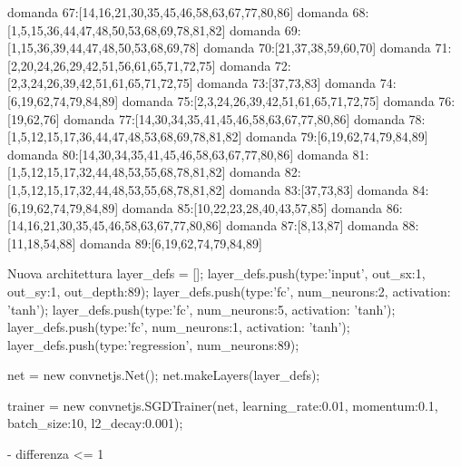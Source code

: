domanda 67:[14,16,21,30,35,45,46,58,63,67,77,80,86]
domanda 68:[1,5,15,36,44,47,48,50,53,68,69,78,81,82]
domanda 69:[1,15,36,39,44,47,48,50,53,68,69,78]
domanda 70:[21,37,38,59,60,70]
domanda 71:[2,20,24,26,29,42,51,56,61,65,71,72,75]
domanda 72:[2,3,24,26,39,42,51,61,65,71,72,75]
domanda 73:[37,73,83]
domanda 74:[6,19,62,74,79,84,89]
domanda 75:[2,3,24,26,39,42,51,61,65,71,72,75]
domanda 76:[19,62,76]
domanda 77:[14,30,34,35,41,45,46,58,63,67,77,80,86]
domanda 78:[1,5,12,15,17,36,44,47,48,53,68,69,78,81,82]
domanda 79:[6,19,62,74,79,84,89]
domanda 80:[14,30,34,35,41,45,46,58,63,67,77,80,86]
domanda 81:[1,5,12,15,17,32,44,48,53,55,68,78,81,82]
domanda 82:[1,5,12,15,17,32,44,48,53,55,68,78,81,82]
domanda 83:[37,73,83]
domanda 84:[6,19,62,74,79,84,89]
domanda 85:[10,22,23,28,40,43,57,85]
domanda 86:[14,16,21,30,35,45,46,58,63,67,77,80,86]
domanda 87:[8,13,87]
domanda 88:[11,18,54,88]
domanda 89:[6,19,62,74,79,84,89]


Nuova architettura
layer_defs = [];
layer_defs.push({type:'input', out_sx:1, out_sy:1, out_depth:89});
layer_defs.push({type:'fc', num_neurons:2, activation: 'tanh'});
layer_defs.push({type:'fc', num_neurons:5, activation: 'tanh'});
layer_defs.push({type:'fc', num_neurons:1, activation: 'tanh'});
layer_defs.push({type:'regression', num_neurons:89});

net = new convnetjs.Net();
net.makeLayers(layer_defs);

trainer = new convnetjs.SGDTrainer(net, {learning_rate:0.01, momentum:0.1, batch_size:10, l2_decay:0.001});

- differenza <= 1

